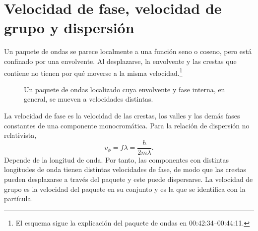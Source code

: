 \section{Velocidad de fase, velocidad de grupo y dispersión}

\begin{classroomqa}
\end{classroomqa}

Un paquete de ondas se parece localmente a una función seno o coseno, pero está confinado por una envolvente. Al desplazarse, la envolvente y las crestas que contiene no tienen por qué moverse a la misma velocidad.\footnote{El esquema sigue la explicación del paquete de ondas en 00:42:34--00:44:11.}

\begin{figure}[t]
\centering
{}
\caption{Un paquete de ondas localizado cuya envolvente y fase interna, en general, se mueven a velocidades distintas.}
\end{figure}

La velocidad de fase es la velocidad de las crestas, los valles y las demás fases constantes de una componente monocromática. Para la relación de dispersión no relativista,
\begin{equation}
v_\phi=f\lambda=\frac{h}{2m\lambda}.
\end{equation}
Depende de la longitud de onda. Por tanto, las componentes con distintas longitudes de onda tienen distintas velocidades de fase, de modo que las crestas pueden desplazarse a través del paquete y este puede dispersarse. La velocidad de grupo es la velocidad del paquete en su conjunto y es la que se identifica con la partícula.

